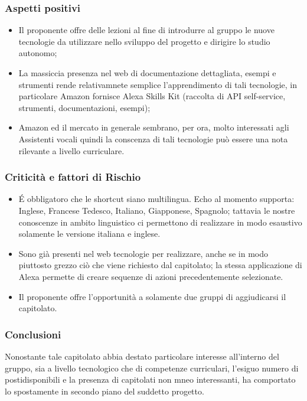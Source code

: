 \subsubsection{Aspetti positivi}
\begin{itemize}
    \item Il proponente offre delle lezioni al fine di introdurre al gruppo le nuove tecnologie da utilizzare nello sviluppo del progetto e dirigire lo studio autonomo;
    \item La massiccia presenza nel web di documentazione dettagliata, esempi e strumenti rende relativamnete semplice l'apprendimento di tali tecnologie, in particolare Amazon fornisce Alexa Skills Kit (raccolta di API self-service, strumenti, documentazioni, esempi);
    \item Amazon ed il mercato in generale sembrano, per ora, molto interessati agli Assistenti vocali quindi la conscenza di tali tecnologie può essere una nota rilevante a livello curriculare.
\end{itemize}
\subsubsection{Criticità e fattori di Rischio}
\begin{itemize}
    \item É obbligatoro che le shortcut siano multilingua. Echo al momento supporta: Inglese, Francese Tedesco, Italiano, Giapponese, Spagnolo; tattavia le nostre conoscenze in ambito linguistico ci permettono di realizzare in modo esaustivo solamente le versione italiana e inglese.
    \item Sono già presenti nel web tecnologie per realizzare, anche se in modo piuttosto grezzo ciò che viene richiesto dal capitolato; la stessa applicazione di Alexa permette di creare sequenze di azioni precedentemente selezionate.
    \item Il proponente offre l'opportunità a solamente due gruppi di aggiudicarsi il capitolato.
\end{itemize}
\subsubsection{Conclusioni}
Nonostante tale capitolato abbia destato particolare interesse all'interno del gruppo, sia a livello tecnologico che di competenze curriculari, l'esiguo numero di postidisponibili e la presenza di capitolati non mneo interessanti, ha comportato lo spostamente in secondo piano del suddetto progetto.


